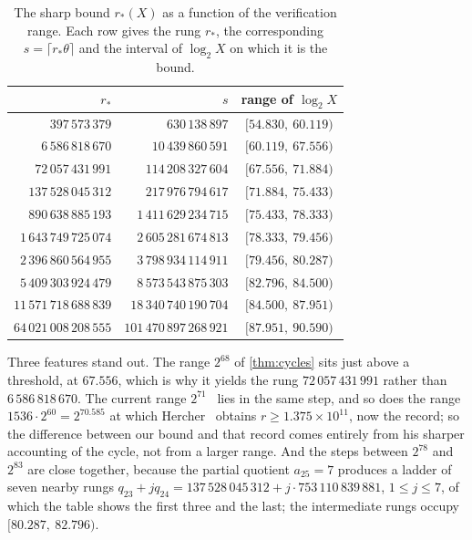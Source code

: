 \begin{table}[ht]
\centering\small
\caption{The sharp bound $r_*(X)$ as a function of the verification range.
Each row gives the rung $r_*$, the corresponding $s=\lceil r_*\theta\rceil$
and the interval of $\log_2X$ on which it is the bound.}
\label{tab:ch8:thresholds}
\begin{tabular}{@{}rrc@{}}
\toprule
$r_*$ & $s$ & range of $\log_2X$ \\
\midrule
$397\,573\,379$ & $630\,138\,897$ & $[54.830,\ 60.119)$ \\
$6\,586\,818\,670$ & $10\,439\,860\,591$ & $[60.119,\ 67.556)$ \\
$72\,057\,431\,991$ & $114\,208\,327\,604$ & $[67.556,\ 71.884)$ \\
$137\,528\,045\,312$ & $217\,976\,794\,617$ & $[71.884,\ 75.433)$ \\
$890\,638\,885\,193$ & $1\,411\,629\,234\,715$ & $[75.433,\ 78.333)$ \\
$1\,643\,749\,725\,074$ & $2\,605\,281\,674\,813$ & $[78.333,\ 79.456)$ \\
$2\,396\,860\,564\,955$ & $3\,798\,934\,114\,911$ & $[79.456,\ 80.287)$ \\
$5\,409\,303\,924\,479$ & $8\,573\,543\,875\,303$ & $[82.796,\ 84.500)$ \\
$11\,571\,718\,688\,839$ & $18\,340\,740\,190\,704$ & $[84.500,\ 87.951)$ \\
$64\,021\,008\,208\,555$ & $101\,470\,897\,268\,921$ & $[87.951,\ 90.590)$ \\
\bottomrule
\end{tabular}
\end{table}

Three features stand out. The range $2^{68}$ of \cref{thm:cycles} sits just above a
threshold, at $67.556$, which is why it yields the rung $72\,057\,431\,991$
rather than $6\,586\,818\,670$. The current range $2^{71}$~\cite{barina2025} lies in the same step, and so does the range $1536\cdot2^{60}=2^{70.585}$ at which Hercher~\cite[Corollary~29]{hercher2023} obtains $r\geq1.375\times10^{11}$, now the record;
so the difference between our bound and that
record comes entirely from his sharper accounting of the
cycle, not from a larger range. And the steps between $2^{78}$ and $2^{83}$
are close together, because the partial quotient $a_{25}=7$ produces a ladder of seven nearby rungs $q_{23}+jq_{24}=137\,528\,045\,312+j\cdot753\,110\,839\,881$, $1\leq j\leq7$, of which the table shows the
first three and the last; the intermediate rungs occupy $[80.287,\ 82.796)$.

